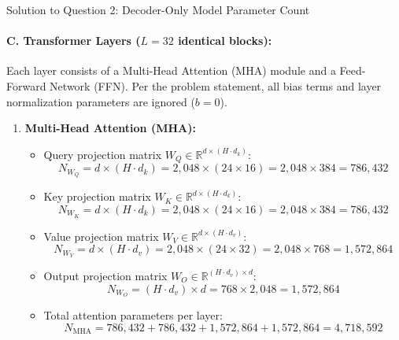\documentclass[11pt,a4paper]{article}
\begin{document}
\begin{solutionbox}{Solution to Question 2: Decoder-Only Model Parameter Count}
\paragraph{C. Transformer Layers ($L = 32$ identical blocks):}
Each layer consists of a Multi-Head Attention (MHA) module and a Feed-Forward Network (FFN). Per the problem statement, all bias terms and layer normalization parameters are ignored ($b = 0$).
\begin{enumerate}[label=\textbf{\roman*.}]
    \item \textbf{Multi-Head Attention (MHA):}
    \begin{itemize}[itemsep=1pt]
        \item Query projection matrix $W_Q \in \mathbb{R}^{d \times (H \cdot d_k)}$:
        \begin{equation*}
            N_{W_Q} = d \times (H \cdot d_k) = 2{,}048 \times (24 \times 16) = 2{,}048 \times 384 = 786{,}432
        \end{equation*}
        \item Key projection matrix $W_K \in \mathbb{R}^{d \times (H \cdot d_k)}$:
        \begin{equation*}
            N_{W_K} = d \times (H \cdot d_k) = 2{,}048 \times (24 \times 16) = 2{,}048 \times 384 = 786{,}432
        \end{equation*}
        \item Value projection matrix $W_V \in \mathbb{R}^{d \times (H \cdot d_v)}$:
        \begin{equation*}
            N_{W_V} = d \times (H \cdot d_v) = 2{,}048 \times (24 \times 32) = 2{,}048 \times 768 = 1{,}572{,}864
        \end{equation*}
        \item Output projection matrix $W_O \in \mathbb{R}^{(H \cdot d_v) \times d}$:
        \begin{equation*}
            N_{W_O} = (H \cdot d_v) \times d = 768 \times 2{,}048 = 1{,}572{,}864
        \end{equation*}
        \item Total attention parameters per layer:
        \begin{equation*}
            N_{\text{MHA}} = 786{,}432 + 786{,}432 + 1{,}572{,}864 + 1{,}572{,}864 = 4{,}718{,}592
        \end{equation*}
    \end{itemize}
    

\end{enumerate}
\end{solutionbox}
\end{document}
